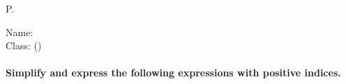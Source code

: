 \documentclass[12pt,a4paper, addpoints] {exam}
\begin{document}
\setlength\dottedlinefillheight{0.79cm}
\footer{}
       {P.\thepage}{}
\headrule 
\footrule

\printanswers %

		{}
		{\textsf{Name:} \underline{\hspace{2.85cm}}\\
                  \hfill \textsf{Class:} \underline{\hspace{1.8cm}}(\qquad)}
\pgfmathsetseed{\year} %
\paragraph*{Simplify and express the following expressions with positive indices.}
\end{document}
